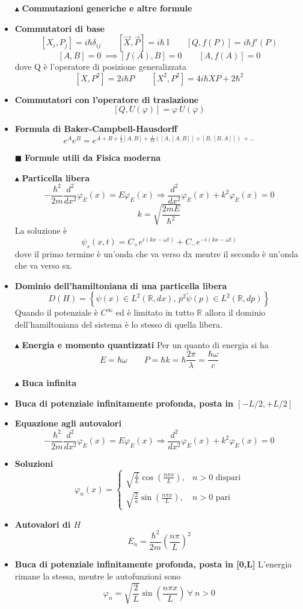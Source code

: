\documentclass{book}
\newcommand{\g}{\textbf}
\newcommand{\e}{\begin{equation}}
\newcommand{\ex}{\end{equation} }
\renewcommand{\it}{\item[$\cdot$]}
\begin{document}
\begin{multicols}{4}
\begin{itemize}
  
\item [$\blacktriangle$] \g{Commutazioni generiche e altre formule}
    \it \g{Commutatori di base}
        \e{[X_i, P_j] = i\hbar\delta_{ij} \qquad [\vec{X}, \vec{P}] = i \hbar\  \mathbb{I} \qquad [Q,f(P)] = i \hbar f'(P)}\ex
        \e{[A,B] = 0 \ \implies [f(A),B] = 0 \qquad [A,f(A)] = 0}\ex
        dove Q è l'operatore di posizione generalizzata
        \e{[X, P^2] = 2i\hbar P \qquad [X^2, P^2] = 4i\hbar XP + 2\hbar^2} \ex
    \it \g{Commutatori con l'operatore di traslazione}
    \e{[Q, U(\varphi)] = \varphi \ U(\varphi)}\ex
    \it \g{Formula di Baker-Campbell-Hausdorff}
    \e{e^{A}e^{B} = e^{A + B + \frac{1}{2}[A, B] + \frac{1}{12}\left([A,[A,B]] + [B,[B,A]]\right)\ + \dots} }\ex
    
\item[$\blacksquare$] \g{Formule utili da Fisica moderna}
\item [$\blacktriangle$] \g{Particella libera }
 \e{-\frac{\hbar^2}{2m} \frac{d^2}{dx^2} \varphi_E(x) = E \varphi_E(x) \Rightarrow 
            \frac{d^2}{dx^2} \varphi_E(x) + k^2 \varphi_E(x) = 0} \ex
            \e{k = \sqrt{\frac{2mE}{\hbar^{2}}}
            }\ex
            La soluzione è
            \e{\psi_{s}(x,t) = C_{+}e^{i(kx - \omega t)} + C_{-}e^{-i(kx - \omega t)}}\ex
            dove il primo termine è un'onda che va verso dx mentre il secondo è un'onda che va verso sx.
    \it \g{Dominio dell’hamiltoniana di una particella libera}
        \e{D(H) = \left\{ \psi(x) \in L^2(\mathbb{R}, dx), \, p^2 \tilde{\psi}(p) \in L^2(\mathbb{R}, dp) \right\}} \ex
    Quando il potenziale è $C^\infty$ ed è limitato in tutto $\mathbb{R}$ allora il dominio dell’hamiltoniana del sistema è lo stesso di quella libera.
\item [$\blacktriangle$] \g{Energia e momento quantizzati}
Per un quanto di energia si ha
\e{E = \hbar \omega \qquad P = \hbar k = \hbar \frac{2 \pi}{\lambda} = \frac{ \hbar \omega}{c}}\ex
\item [$\blacktriangle$] \g{Buca infinita}
    \it \g{Buca di potenziale infinitamente profonda, posta in $[-L/2, +L/2]$}
        \it \g{Equazione agli autovalori}
            \e{-\frac{\hbar^2}{2m} \frac{d^2}{dx^2} \varphi_E(x) = E \varphi_E(x) \Rightarrow 
            \frac{d^2}{dx^2} \varphi_E(x) + k^2 \varphi_E(x) = 0} \ex
        \it \g{Soluzioni}
            \e{\varphi_n(x) = 
            \begin{cases} 
                \sqrt{\frac{2}{L}} \cos\left(\frac{n\pi x}{L}\right), & n > 0 \text{ dispari} \\
                \sqrt{\frac{2}{a}} \sin\left(\frac{n\pi x}{L}\right), & n > 0 \text{ pari}
            \end{cases}} \ex
        \it \g{Autovalori di $H$}
            \e{E_n = \frac{\hbar^2}{2m} \left(\frac{n\pi}{L}\right)^2} \ex
    \it \g{Buca di potenziale infinitamente profonda, posta in [0,L]}
    L'energia rimane la stessa, mentre le autofunzioni sono
    \e{\varphi_{n} = \sqrt{\frac{2}{L}}\sin(\frac{n \pi x}{L}) \ \forall \ n > 0}\ex
    

\end{itemize}
\end{multicols}
\end{document}
